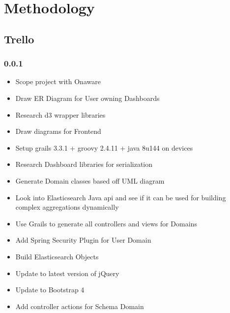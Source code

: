 \documentclass[12pt]{report}
\begin{document}
\chapter{Methodology}
\section{Trello}\subsection{0.0.1}
\begin{itemize}
\item Scope project with Onaware
\item Draw ER Diagram for User owning Dashboards
\item Research d3 wrapper libraries
\item Draw diagrams for Frontend
\item Setup grails 3.3.1 + groovy 2.4.11 + java 8u144 on devices
\item Research Dashboard libraries for serialization
\item Generate Domain classes based off UML diagram
\item Look into Elasticsearch Java api and see if it can be used for building complex aggregations dynamically
\item Use Grails to generate all controllers and views for Domains
\item Add Spring Security Plugin for User Domain
\item Build Elasticsearch Objects
\item Update to latest version of jQuery
\item Update to Bootstrap 4
\item Add controller actions for Schema Domain
\end{itemize}
\end{document}
